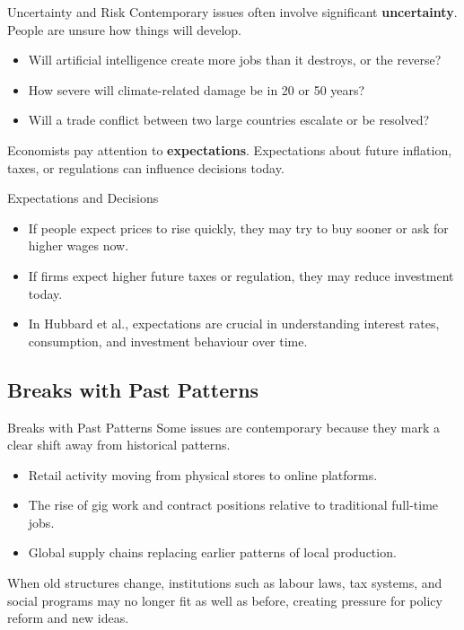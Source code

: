 \documentclass[aspectratio=169]{beamer}
\begin{document}
\begin{frame}{Uncertainty and Risk}
  \transfade
  Contemporary issues often involve significant \textbf{uncertainty}. People are unsure how things will develop.

  \begin{itemize}
    \item Will artificial intelligence create more jobs than it destroys, or the reverse?
    \item How severe will climate-related damage be in 20 or 50 years?
    \item Will a trade conflict between two large countries escalate or be resolved?
  \end{itemize}

  \vspace{0.3cm}
  Economists pay attention to \textbf{expectations}. Expectations about future inflation, taxes, or
  regulations can influence decisions today.
\end{frame}

\begin{frame}{Expectations and Decisions}
  \transfade
  \begin{itemize}
    \item If people expect prices to rise quickly, they may try to buy sooner or ask for higher wages now.
    \item If firms expect higher future taxes or regulation, they may reduce investment today.
    \item In Hubbard et al., expectations are crucial in understanding interest rates, consumption,
    and investment behaviour over time.
  \end{itemize}
\end{frame}

\subsection{Breaks with Past Patterns}

\begin{frame}{Breaks with Past Patterns}
  \transfade
  Some issues are contemporary because they mark a clear shift away from historical patterns.

  \begin{itemize}
    \item Retail activity moving from physical stores to online platforms.
    \item The rise of gig work and contract positions relative to traditional full-time jobs.
    \item Global supply chains replacing earlier patterns of local production.
  \end{itemize}

  \vspace{0.3cm}
  When old structures change, institutions such as labour laws, tax systems, and social
  programs may no longer fit as well as before, creating pressure for policy reform and new ideas.
\end{frame}
\end{document}
